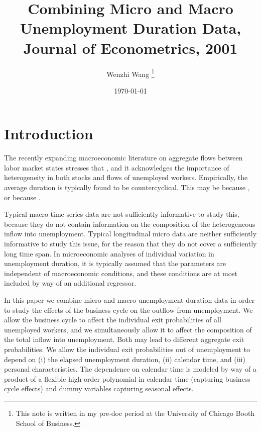 \documentclass[12pt]{article}
\newcommand{\highlightP}[1]{{\emph{\color{MyPink}{#1}}}}
\theoremstyle{definition}
\begin{document}
 


\title{\bf Combining Micro and Macro Unemployment Duration Data, Journal of Econometrics, 2001} 
\author{Wenzhi Wang \thanks{This note is written in my pre-doc period at the University of Chicago Booth School of Business.} } 
\date{\today} 
\maketitle 

\citet{vandenbergCombiningMicroMacro2001}

\section{Introduction}

The recently expanding macroeconomic literature on aggregate flows between labor market states stresses that \highlightP{the distribution of unemployment durations changes markedly over the business cycle}, and it acknowledges the importance of heterogeneity in both stocks and flows of unemployed workers. Empirically, the average duration is typically found to be countercyclical. This may be because \highlightP{in a recession the exit probability out of unemployment decreases for all workers}, or because \highlightP{in a recession the composition of the (heterogeneous) inflow shifts towards individuals who have low exit probabilities}. 

Typical macro time-series data are not sufficiently informative to study this, because they do not contain information on the composition of the heterogeneous inflow into unemployment. Typical longitudinal micro data are neither sufficiently informative to study this issue, for the reason that they do not cover a sufficiently long time span. In microeconomic analyses of individual variation in unemployment duration, it is typically assumed that the parameters are independent of macroeconomic conditions, and these conditions are at most included by way of an additional regressor. 

In this paper we combine micro and macro unemployment duration data in order to study the effects of the business cycle on the outflow from unemployment. We allow the business cycle to affect the individual exit probabilities of all unemployed workers, and we simultaneously allow it to affect the composition of the total inflow into unemployment. Both may lead to different aggregate exit probabilities. We allow the individual exit probabilities out of unemployment to depend on (i) the elapsed unemployment duration, (ii) calendar time, and (iii) personal characteristics. The dependence on calendar time is modeled by way of a product of a flexible high-order polynomial in calendar time (capturing business cycle effects) and dummy variables capturing seasonal effects. 
\end{document}
